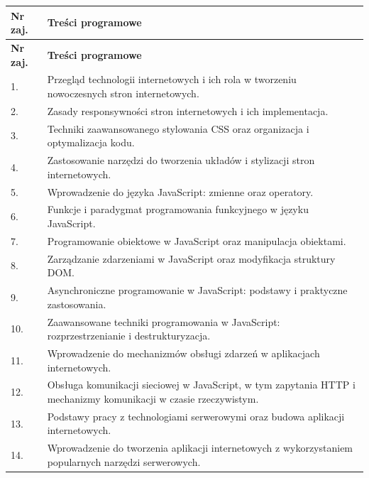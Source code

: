 \documentclass[12pt, a4paper]{article}
\newcommand{\thdrule}{\noalign{\global\setlength{\extrarowheight}{0pt}}}
\newcommand{\thdend}{\noalign{\global\setlength{\extrarowheight}{3pt}}}
\begin{document}
{\scriptsize
\begin{longtable}{m{1.5cm}m{14.5cm}}
\thdrule\toprule
\rowcolor{pjatkRed} {\color{white}\textbf{Nr zaj.}} & {\color{white}\textbf{Treści programowe}} \\
\midrule\thdend
\endfirsthead
\thdrule\toprule
\rowcolor{pjatkRed} {\color{white}\textbf{Nr zaj.}} & {\color{white}\textbf{Treści programowe}} \\
\midrule\thdend
\endhead
  \rowcolor{tableRowLight} 1. & Przegląd technologii internetowych i ich rola w tworzeniu nowoczesnych stron internetowych. \\
  \rowcolor{tableRowAlt} 2. & Zasady responsywności stron internetowych i ich implementacja. \\
  \rowcolor{tableRowLight} 3. & Techniki zaawansowanego stylowania CSS oraz organizacja i optymalizacja kodu. \\
  \rowcolor{tableRowAlt} 4. & Zastosowanie narzędzi do tworzenia układów i stylizacji stron internetowych. \\
  \rowcolor{tableRowLight} 5. & Wprowadzenie do języka JavaScript: zmienne oraz operatory. \\
  \rowcolor{tableRowAlt} 6. & Funkcje i paradygmat programowania funkcyjnego w języku JavaScript. \\
  \rowcolor{tableRowLight} 7. & Programowanie obiektowe w JavaScript oraz manipulacja obiektami. \\
  \rowcolor{tableRowAlt} 8. & Zarządzanie zdarzeniami w JavaScript oraz modyfikacja struktury DOM. \\
  \rowcolor{tableRowLight} 9. & Asynchroniczne programowanie w JavaScript: podstawy i praktyczne zastosowania. \\
  \rowcolor{tableRowAlt} 10. & Zaawansowane techniki programowania w JavaScript: rozprzestrzenianie i destrukturyzacja. \\
  \rowcolor{tableRowLight} 11. & Wprowadzenie do mechanizmów obsługi zdarzeń w aplikacjach internetowych. \\
  \rowcolor{tableRowAlt} 12. & Obsługa komunikacji sieciowej w JavaScript, w tym zapytania HTTP i mechanizmy komunikacji w czasie rzeczywistym. \\
  \rowcolor{tableRowLight} 13. & Podstawy pracy z technologiami serwerowymi oraz budowa aplikacji internetowych. \\
  \rowcolor{tableRowAlt} 14. & Wprowadzenie do tworzenia aplikacji internetowych z wykorzystaniem popularnych narzędzi serwerowych. \\
\bottomrule
\end{longtable}}
\end{document}
